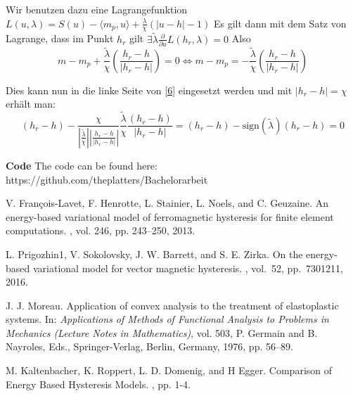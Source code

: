 \documentclass[12pt]{article}
\begin{document}
Wir benutzen dazu eine Lagrangefunktion $L(u,\lambda) = S(u) - \langle m_p, u\rangle +  \frac \lambda \chi (|u - h| - 1)$
Es gilt dann mit dem Satz von Lagrange, dass im Punkt $h_r$ gilt $\exists \tilde \lambda \frac {\partial}{\partial u}L(h_r,\lambda) = 0$
Also $$m - m_p + \frac {\tilde \lambda}{\chi} (\frac{h_r - h}{|h_r - h|}) = 0 \Leftrightarrow m - m_p = - \frac {\tilde \lambda}{\chi} (\frac{h_r - h}{|h_r - h|})$$

Dies kann nun in die linke Seite von \eqref{6} eingesetzt werden und  mit $|h_r - h| = \chi$ erhält man: $$(h_r - h) - \frac{\chi}{|\frac{\tilde \lambda}{\chi}| |\frac{h_r - h}{|h_r - h|}|} \frac{\tilde \lambda}{\chi} \frac{(h_r - h)}{|h_r - h|} = (h_r - h) - \text{sign}(\tilde{\lambda})(h_r - h) = 0$$

\textbf{Code}
The code can be found here: https://github.com/theplatters/Bachelorarbeit
\begin{thebibliography}{10}

V. François-Lavet, F. Henrotte, L. Stainier, L. Noels, and C. Geuzaine.
\newblock An energy-based variational model of ferromagnetic hysteresis for finite element computations.
, vol. 246, pp. 243–250, 2013.

L. Prigozhin1, V. Sokolovsky, J. W. Barrett, and S. E. Zirka. 
\newblock On the energy-based variational model
for vector magnetic hysteresis.
, vol.~52, pp.~7301211, 2016.

J. J. Moreau. 
\newblock Application of convex analysis to the treatment of elastoplastic systems. 
\newblock In: {\em Applications of Methods of Functional Analysis to Problems in Mechanics (Lecture Notes in Mathematics)}, vol. 503, 
P. Germain and B. Nayroles, Eds.,
Springer-Verlag, Berlin, Germany, 1976, pp. 56–89.

M. Kaltenbacher, K. Roppert, L. D. Domenig, and H Egger.
\newblock Comparison of Energy Based Hysteresis Models.
, pp. 1-4. %
\end{thebibliography}


\end{document}
